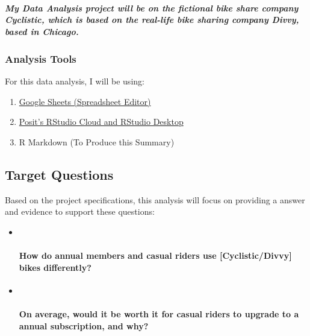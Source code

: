 \documentclass[
]{article}
\providecommand{\tightlist}{%
  \setlength{\itemsep}{0pt}\setlength{\parskip}{0pt}}
\begin{document}
\subparagraph{My Data Analysis project will be on the fictional bike
share company Cyclistic, which is based on the real-life bike sharing
company Divvy, based in
Chicago.}\label{my-data-analysis-project-will-be-on-the-fictional-bike-share-company-cyclistic-which-is-based-on-the-real-life-bike-sharing-company-divvy-based-in-chicago.}

\subsubsection{Analysis Tools}\label{analysis-tools}

For this data analysis, I will be using:

\begin{enumerate}
\def\labelenumi{\arabic{enumi}.}
\tightlist
\item
  \href{sheets.google.com}{Google Sheets (Spreadsheet Editor)}
\item
  \href{https://posit.co/downloads/}{Posit's RStudio Cloud and RStudio
  Desktop}
\item
  R Markdown (To Produce this Summary)
\end{enumerate}

\subsection{Target Questions}\label{target-questions}

Based on the project specifications, this analysis will focus on
providing a answer and evidence to support these questions:

\begin{itemize}
\item ~
  \paragraph{How do annual members and casual riders use
  {[}Cyclistic/Divvy{]} bikes
  differently?}\label{how-do-annual-members-and-casual-riders-use-cyclisticdivvy-bikes-differently}
\item ~
  \paragraph{On average, would it be worth it for casual riders to
  upgrade to a annual subscription, and
  why?}\label{on-average-would-it-be-worth-it-for-casual-riders-to-upgrade-to-a-annual-subscription-and-why}
\end{itemize}
\end{document}
